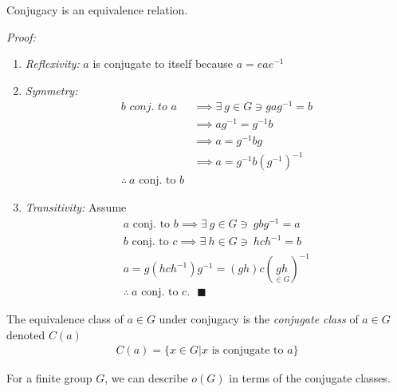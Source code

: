 \begin{lemma}
Conjugacy is an equivalence relation. \steezybreak

\noindent \textit{Proof:}
\begin{enumerate}[label=\roman*)]
    \item \textit{Reflexivity:} $a$ is conjugate to itself because $a = eae^{-1}$
    \item \textit{Symmetry:} \begin{align}
        b \textit{ conj. to } a &\implies \exists \ g\in G \ni gag^{-1}=b \nonumber \\
        &\implies ag^{-1}=g^{-1}b \nonumber \\
        &\implies a= g^{-1}bg \nonumber \\
        &\implies a= g^{-1}b(g^{-1})^{-1} \nonumber \\
        \therefore \ a \text{ conj. to } b & \nonumber
    \end{align}
    \item \textit{Transitivity:} Assume \begin{align}
        a \text{ conj. to } b \implies \exists \ g \in G \ni \ gbg^{-1}=a \nonumber \\
        b \text{ conj. to } c \implies \exists \ h \in G \ni \ hch^{-1}=b \nonumber \\
        a = g(hch^{-1})g^{-1} = (gh)c(\underset{\in G}{gh})^{-1} \nonumber \\
        \therefore \ a \text{ conj. to } c. \ \ \ \blacksquare \nonumber
    \end{align}
\end{enumerate}
\end{lemma}
\begin{definition}
The equivalence class of $a\in G$ under conjugacy is the \textit{conjugate class} of $a\in G$
denoted $C(a)$
\begin{align}
    C(a)= \{x \in G | x \text{ is conjugate to } a\}
\end{align}
\end{definition}
For a finite group $G$, we can describe $o(G)$ in terms of the conjugate classes. \steezybreak

